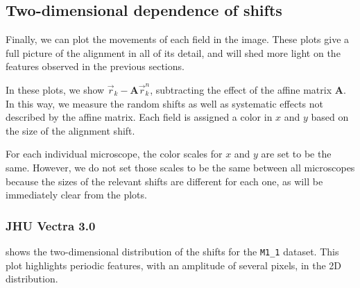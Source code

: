 \documentclass{article}
\newcommand{\matrixbold}[1]{\mathbf{#1}}
\newcommand{\M}[2]{\texttt{M#1\_#2}}
\begin{document}
\clearpage

\subsection{Two-dimensional dependence of shifts}

Finally, we can plot the movements of each field in the image.  These plots give a full picture of the alignment in all of its detail, and will shed more light on the features observed in the previous sections.

In these plots, we show $\vec{r}_k-\matrixbold{A}\vec{r}_k^n$, subtracting the effect of the affine matrix $\matrixbold{A}$.  In this way, we measure the random shifts as well as systematic effects not described by the affine matrix.  Each field is assigned a color in $x$ and $y$ based on the size of the alignment shift.

For each individual microscope, the color scales for $x$ and $y$ are set to be the same.  However, we do not set those scales to be the same between all microscopes because the sizes of the relevant shifts are different for each one, as will be immediately clear from the plots.

\subsubsection{JHU Vectra 3.0}
\label{sec:vectra2D}

 shows the two-dimensional distribution of the shifts for the \M11 dataset.  This plot highlights periodic features, with an amplitude of several pixels, in the 2D distribution.
\end{document}
